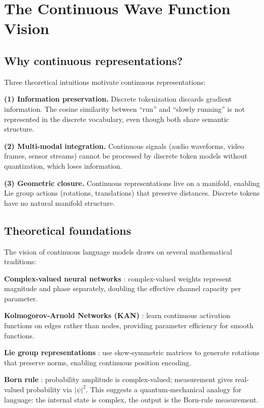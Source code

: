 \documentclass{article}
\begin{document}
\section{The Continuous Wave Function Vision}

\subsection{Why continuous representations?}

Three theoretical intuitions motivate continuous representations:

\textbf{(1) Information preservation.} Discrete tokenization discards gradient information. The cosine similarity between ``run'' and ``slowly running'' is not represented in the discrete vocabulary, even though both share semantic structure.

\textbf{(2) Multi-modal integration.} Continuous signals (audio waveforms, video frames, sensor streams) cannot be processed by discrete token models without quantization, which loses information.

\textbf{(3) Geometric closure.} Continuous representations live on a manifold, enabling Lie group actions (rotations, translations) that preserve distances. Discrete tokens have no natural manifold structure.

\subsection{Theoretical foundations}

The vision of continuous language models draws on several mathematical traditions:

\textbf{Complex-valued neural networks} \citep{nitta2003complex,trabelsi2018deep}: complex-valued weights represent magnitude and phase separately, doubling the effective channel capacity per parameter.

\textbf{Kolmogorov-Arnold Networks (KAN)} \citep{liu2024kan}: learn continuous activation functions on edges rather than nodes, providing parameter efficiency for smooth functions.

\textbf{Lie group representations} \citep{lezama2018overcoming,wang2023rope}: use skew-symmetric matrices to generate rotations that preserve norms, enabling continuous position encoding.

\textbf{Born rule} \citep{born1926quantenmechanik}: probability amplitude is complex-valued; measurement gives real-valued probability via $|\psi|^2$. This suggests a quantum-mechanical analogy for language: the internal state is complex, the output is the Born-rule measurement.
\end{document}
